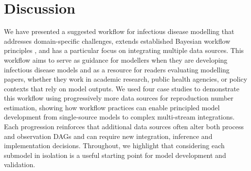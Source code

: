 \documentclass{article}
\begin{document}
\section{Discussion}


We have presented a suggested workflow for infectious disease modelling that addresses domain-specific challenges, extends established Bayesian workflow principles \citep{green2003highly,gelman2020bayesian}, and has a particular focus on integrating multiple data sources.
This workflow aims to serve as guidance for modellers when they are developing infectious disease models and as a resource for readers evaluating modelling papers, whether they work in academic research, public health agencies, or policy contexts that rely on model outputs.
We used four case studies to demonstrate this workflow using progressively more data sources for reproduction number estimation, showing how workflow practices can enable principled model development from single-source models to complex multi-stream integrations.
Each progression reinforces that additional data sources often alter both process and observation DAGs and can require new integration, inference and implementation decisions.
Throughout, we highlight that considering each submodel in isolation is a useful starting point for model development and validation.

\end{document}
